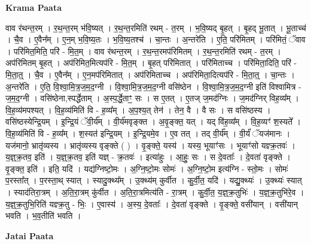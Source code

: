 \documentclass[17pt]{extarticle}
\begin{document}
\textbf{Krama Paata} \newline

वाव र॑थन्त॒रम् । र॒थ॒न्त॒रम् भ॑वि॒ष्यत् । र॒थ॒न्त॒रमिति॑ रथम् - त॒रम् । भ॒वि॒ष्यद् बृ॒हत् । बृ॒हद् भू॒तात् । भू॒ताच्च॑ । चै॒व । ए॒वैन᳚म् । ए॒न॒म् भ॒वि॒ष्य॒तः । भ॒वि॒ष्य॒तश्च॑ । चा॒न्तः । अ॒न्तरे॑ति । ए॒ति॒ परि॑मितम् । परि॑मितं॒ ॅवाव । परि॑मित॒मिति॒ परि॑ - मि॒त॒म् । वाव र॑थन्त॒रम् । र॒थ॒न्त॒रमप॑रिमितम् । र॒थ॒न्त॒रमिति॑ रथम् - त॒रम् । अप॑रिमितम् बृ॒हत् । अप॑रिमित॒मित्यप॑रि - मि॒त॒म् । बृ॒हत् परि॑मितात् । परि॑मिताच्च । परि॑मिता॒दिति॒ परि॑ - मि॒ता॒त्॒ । चै॒व । ए॒वैन᳚म् । ए॒न॒मप॑रिमितात् । अप॑रिमिताच्च । अप॑रिमिता॒दित्यप॑रि - मि॒ता॒त्॒ । चा॒न्तः । अ॒न्तरे॑ति । ए॒ति॒ वि॒श्वा॒मि॒त्र॒ज॒म॒द॒ग्नी । वि॒श्वा॒मि॒त्र॒ज॒म॒द॒ग्नी वसि॑ष्ठेन । वि॒श्वा॒मि॒त्र॒ज॒म॒द॒ग्नी इति॑ विश्वामित्र - ज॒म॒द॒ग्नी । वसि॑ष्ठेना,स्पर्द्धेताम् । अ॒स्प॒र्द्धे॒ताꣳ॒॒ सः । स ए॒तत् । ए॒तज् ज॒मद॑ग्निः । ज॒मद॑ग्निर् विह॒व्य᳚म् । वि॒ह॒व्य॑मपश्यत् । वि॒ह॒व्य॑मिति॑ वि - ह॒व्य᳚म् । अ॒प॒श्य॒त् तेन॑ । तेन॒ वै । वै सः । स वसि॑ष्ठस्य । वसि॑ष्ठस्येन्द्रि॒यम् । इ॒न्द्रि॒यं ॅवी॒र्य᳚म् । वी॒र्य॑मवृङ्क्त । अ॒वृ॒ङ्क्त॒ यत् । यद् वि॑ह॒व्य᳚म् । वि॒ह॒व्यꣳ॑ श॒स्यते᳚ । वि॒ह॒व्य॑मिति॑ वि - ह॒व्य᳚म् । श॒स्यत॑ इन्द्रि॒यम् । इ॒न्द्रि॒यमे॒व । ए॒व तत् । तद् वी॒र्य᳚म् । वी॒र्यं॑ ॅयज॑मानः । यज॑मानो॒ भ्रातृ॑व्यस्य । भ्रातृ॑व्यस्य वृङ्क्ते ( ) । वृ॒ङ्क्ते॒ यस्य॑ । यस्य॒ भूयाꣳ॑सः । भूयाꣳ॑सो यज्ञ्क्र॒तवः॑ । य॒ज्ञ्॒क्र॒तव॒ इति॑ । य॒ज्ञ्॒क्र॒तव॒ इति॑ यज्ञ् - क्र॒तवः॑ । इत्या॑हुः । आ॒हुः॒ सः । स दे॒वताः᳚ । दे॒वता॑ वृङ्क्ते । वृ॒ङ्क्त॒ इति॑ । इति॒ यदि॑ । यद्य॑ग्निष्टो॒मः । अ॒ग्नि॒ष्टो॒मः सोमः॑ । अ॒ग्नि॒ष्टो॒म इत्य॑ग्नि - स्तो॒मः । सोमः॑ प॒रस्ता᳚त् । प॒रस्ता॒थ् स्यात् । स्यादु॒क्थ्य᳚म् । उ॒क्थ्य॑म् कुर्वीत । कु॒र्वी॒त॒ यदि॑ । यद्यु॒क्थ्यः॑ । उ॒क्थ्यः॑ स्यात् । स्याद॑तिरा॒त्रम् । अ॒ति॒रा॒त्रम् कु॑र्वीत । अ॒ति॒रा॒त्रमित्य॑ति - रा॒त्रम् । कु॒र्वी॒त॒ य॒ज्ञ्॒क्र॒तुभिः॑ । य॒ज्ञ्॒क्र॒तुभि॑रे॒व । य॒ज्ञ्॒क्र॒तुभि॒रिति॑ यज्ञ्क्र॒तु - भिः॒ । ए॒वास्य॑ । अ॒स्य॒ दे॒वताः᳚ । दे॒वता॑ वृङ्क्ते । वृ॒ङ्क्ते॒ वसी॑यान् । वसी॑यान् भवति । भ॒व॒तीति॑ भवति । \newline

\textbf{Jatai Paata} \newline
\end{document}
